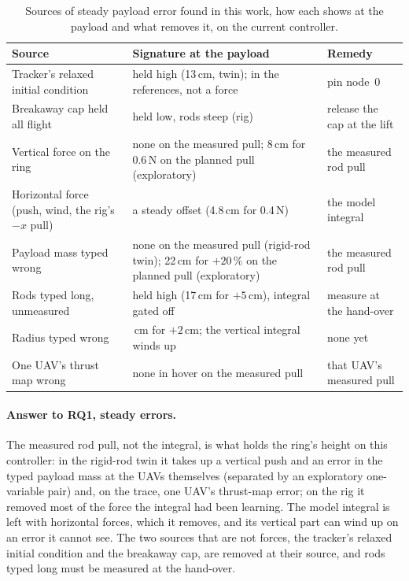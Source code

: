 \begin{table}[htbp]
\centering
\footnotesize
\caption{Sources of steady payload error found in this work, how each shows at the payload and what
removes it, on the current controller.}
\label{tab:error_sources}
\begin{tabularx}{\textwidth}{>{\raggedright\arraybackslash}p{3.4cm}>{\raggedright\arraybackslash}X>{\raggedright\arraybackslash}p{3.6cm}}
\toprule
Source & Signature at the payload & Remedy \\
\midrule
Tracker's relaxed initial condition & held high (13\,cm, twin); in the references, not a force & pin node~0 \\
Breakaway cap held all flight & held low, rods steep (rig) & release the cap at the lift \\
Vertical force on the ring & none on the measured pull; 8\,cm for 0.6\,N on the planned pull (exploratory) & the measured rod pull \\
Horizontal force (push, wind, the rig's $-x$ pull) & a steady offset (4.8\,cm for 0.4\,N) & the model integral \\
Payload mass typed wrong & none on the measured pull (rigid-rod twin); 22\,cm for $+20$\,\% on the planned pull (exploratory) & the measured rod pull \\
Rods typed long, unmeasured & held high (17\,cm for $+5$\,cm), integral gated off & measure at the hand-over \\
Radius typed wrong & 0.9\,cm for $+2$\,cm; the vertical integral winds up & none yet \\
One UAV's thrust map wrong & none in hover on the measured pull & that UAV's measured pull \\
\bottomrule
\end{tabularx}
\end{table}

\paragraph{Answer to RQ1, steady errors.} The measured rod pull, not the integral, is what holds the ring's height on
this controller: in the rigid-rod twin it takes up a vertical push and an error in the typed payload mass at the UAVs
themselves (separated by an exploratory one-variable pair) and, on the trace, one UAV's thrust-map error; on the rig it
removed most of the force the integral had been learning.
The model integral is left with horizontal forces, which it removes, and its vertical part can wind up on an error it
cannot see. The two sources that are not forces, the tracker's relaxed initial condition and the breakaway cap, are
removed at their source, and rods typed long must be measured at the hand-over.
